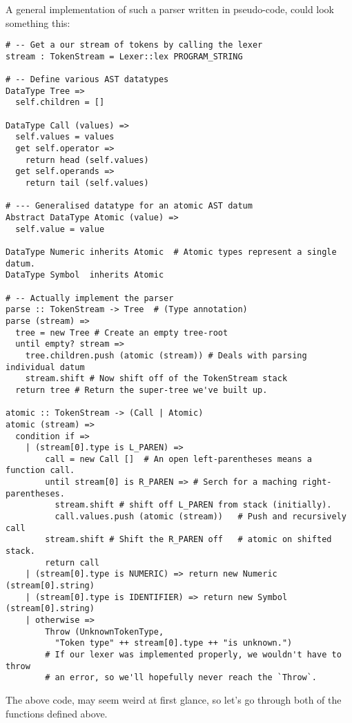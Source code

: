 \documentclass{article}
\begin{document}
      A general implementation of such a parser written in pseudo-code,
      could look something this:
      \clearpage
      \begin{verbatim}
# -- Get a our stream of tokens by calling the lexer
stream : TokenStream = Lexer::lex PROGRAM_STRING

# -- Define various AST datatypes
DataType Tree =>
  self.children = []

DataType Call (values) =>
  self.values = values
  get self.operator =>
    return head (self.values)
  get self.operands =>
    return tail (self.values)

# --- Generalised datatype for an atomic AST datum
Abstract DataType Atomic (value) =>
  self.value = value

DataType Numeric inherits Atomic  # Atomic types represent a single datum.
DataType Symbol  inherits Atomic

# -- Actually implement the parser
parse :: TokenStream -> Tree  # (Type annotation)
parse (stream) =>
  tree = new Tree # Create an empty tree-root
  until empty? stream =>
    tree.children.push (atomic (stream)) # Deals with parsing individual datum
    stream.shift # Now shift off of the TokenStream stack
  return tree # Return the super-tree we've built up.

atomic :: TokenStream -> (Call | Atomic)
atomic (stream) =>
  condition if =>
    | (stream[0].type is L_PAREN) =>
        call = new Call []  # An open left-parentheses means a function call.
        until stream[0] is R_PAREN => # Serch for a maching right-parentheses.
          stream.shift # shift off L_PAREN from stack (initially).
          call.values.push (atomic (stream))   # Push and recursively call
        stream.shift # Shift the R_PAREN off   # atomic on shifted stack.
        return call
    | (stream[0].type is NUMERIC) => return new Numeric (stream[0].string)
    | (stream[0].type is IDENTIFIER) => return new Symbol (stream[0].string)
    | otherwise =>
        Throw (UnknownTokenType,
          "Token type" ++ stream[0].type ++ "is unknown.")
        # If our lexer was implemented properly, we wouldn't have to throw
        # an error, so we'll hopefully never reach the `Throw`.

      \end{verbatim}
      \clearpage

      The above code, may seem weird at first glance, so let's go through
      both of the functions defined above.
\end{document}
